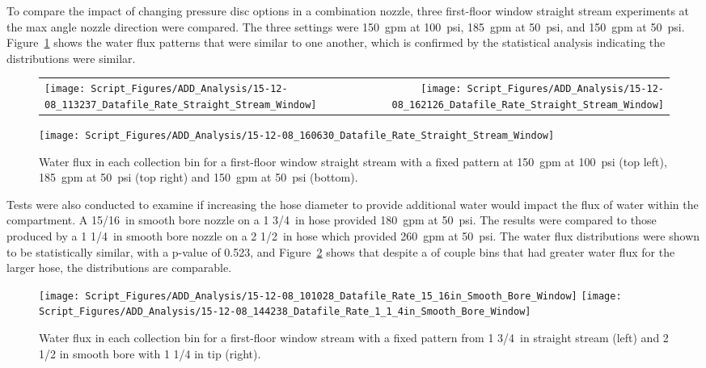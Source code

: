 \documentclass[12pt,oneside]{book}
\begin{document}
To compare the impact of changing pressure disc options in a combination nozzle, three first-floor window straight stream experiments at the max angle nozzle direction were compared. The three settings were 150~gpm at 100~psi, 185~gpm at 50~psi, and 150~gpm at 50~psi. Figure~\ref{fig:Window_First_Floor_Varying_Nozzle_Pressure_SS_Fixed_Pattern} shows the water flux patterns that were similar to one another, which is confirmed by the statistical analysis indicating the distributions were similar.   

\begin{figure}[ht]
\begin{tabular*}{\textwidth}{lr}
\texttt{[image: Script\_Figures/ADD\_Analysis/15-12-08\_113237\_Datafile\_Rate\_Straight\_Stream\_Window]} & 
\texttt{[image: Script\_Figures/ADD\_Analysis/15-12-08\_162126\_Datafile\_Rate\_Straight\_Stream\_Window]} \\
\end{tabular*}
\centering
\texttt{[image: Script\_Figures/ADD\_Analysis/15-12-08\_160630\_Datafile\_Rate\_Straight\_Stream\_Window]}  
\caption[Water Flux Varying Pressure Discs in Combination Nozzle]{Water flux in each collection bin for a first-floor window straight stream with a fixed pattern at 150~gpm at 100~psi (top left), 185~gpm at 50~psi (top right) and 150~gpm at 50~psi (bottom).}
\label{fig:Window_First_Floor_Varying_Nozzle_Pressure_SS_Fixed_Pattern}
\end{figure}

\clearpage

Tests were also conducted to examine if increasing the hose diameter to provide additional water would impact the flux of water within the compartment. A 15/16~in smooth bore nozzle on a 1 3/4~in hose provided 180~gpm at 50~psi. The results were compared to those produced by a 1 1/4~in smooth bore nozzle on a 2 1/2~in hose which provided 260~gpm at 50~psi. The water flux distributions were shown to be statistically similar, with a p-value of 0.523, and Figure~\ref{fig:Window_First_Floor_Varying_Hose_Size} shows that despite a of couple bins that had greater water flux for the larger hose, the distributions are comparable.

\begin{figure}[ht]
\texttt{[image: Script\_Figures/ADD\_Analysis/15-12-08\_101028\_Datafile\_Rate\_15\_16in\_Smooth\_Bore\_Window]}
\texttt{[image: Script\_Figures/ADD\_Analysis/15-12-08\_144238\_Datafile\_Rate\_1\_1\_4in\_Smooth\_Bore\_Window]} \\ 
\caption[Water Flux Varying Hose Size]{Water flux in each collection bin for a first-floor window stream with a fixed pattern from 1 3/4~in straight stream (left) and 2 1/2 in smooth bore with 1 1/4 in tip (right).}
\label{fig:Window_First_Floor_Varying_Hose_Size}
\end{figure}
\end{document}
